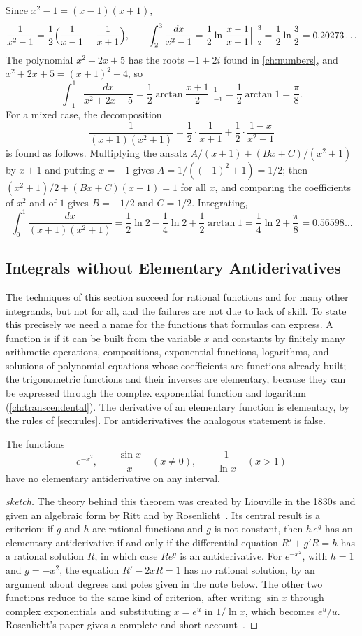 Since $x^2-1=(x-1)(x+1)$,
\[
\frac1{x^2-1}=\frac12\Bigl(\frac1{x-1}-\frac1{x+1}\Bigr),\qquad\int_2^3\frac{dx}{x^2-1}=\frac12\ln\Bigl|\frac{x-1}{x+1}\Bigr|\,\Big|_2^3=\frac12\ln\frac32=0.20273\ldots
\]
The polynomial $x^2+2x+5$ has the roots $-1\pm2i$ found in \cref{ch:numbers}, and $x^2+2x+5=(x+1)^2+4$, so
\[
\int_{-1}^1\frac{dx}{x^2+2x+5}=\frac12\arctan\frac{x+1}2\,\Big|_{-1}^1=\frac12\arctan1=\frac\pi8 .
\]
For a mixed case, the decomposition
\[
\frac1{(x+1)(x^2+1)}=\frac12\cdot\frac1{x+1}+\frac12\cdot\frac{1-x}{x^2+1}
\]
is found as follows. Multiplying the ansatz $A/(x+1)+(Bx+C)/(x^2+1)$ by $x+1$ and putting $x=-1$ gives $A=1/((-1)^2+1)=1/2$; then $(x^2+1)/2+(Bx+C)(x+1)=1$ for all $x$, and comparing the coefficients of $x^2$ and of $1$ gives $B=-1/2$ and $C=1/2$. Integrating,
\[
\int_0^1\frac{dx}{(x+1)(x^2+1)}=\frac12\ln2-\frac14\ln2+\frac12\arctan1=\frac14\ln2+\frac\pi8=0.56598\ldots
\]

\subsection{Integrals without Elementary Antiderivatives}

The techniques of this section succeed for rational functions and for many other integrands, but not for all, and the failures are not due to lack of skill. To state this precisely we need a name for the functions that formulas can express. A function is  if it can be built from the variable $x$ and constants by finitely many arithmetic operations, compositions, exponential functions, logarithms, and solutions of polynomial equations whose coefficients are functions already built; the trigonometric functions and their inverses are elementary, because they can be expressed through the complex exponential function and logarithm (\cref{ch:transcendental}). The derivative of an elementary function is elementary, by the rules of \cref{sec:rules}. For antiderivatives the analogous statement is false.

\begin{theorem}[Liouville]
\label{thm:liouville}
The functions
\[
e^{-x^2},\qquad\frac{\sin x}x\quad(x\ne0),\qquad\frac1{\ln x}\quad(x>1)
\]
have no elementary antiderivative on any interval.
\end{theorem}

\begin{proof}[sketch]
The theory behind this theorem was created by Liouville in the 1830s and given an algebraic form by Ritt and by Rosenlicht~\cite{ritt1948,rosenlicht1972}. Its central result is a criterion: if $g$ and $h$ are rational functions and $g$ is not constant, then $h\,e^g$ has an elementary antiderivative if and only if the differential equation $R'+g'R=h$ has a rational solution $R$, in which case $Re^g$ is an antiderivative. For $e^{-x^2}$, with $h=1$ and $g=-x^2$, the equation $R'-2xR=1$ has no rational solution, by an argument about degrees and poles given in the note below. The other two functions reduce to the same kind of criterion, after writing $\sin x$ through complex exponentials and substituting $x=e^u$ in $1/\ln x$, which becomes $e^u/u$. Rosenlicht's paper gives a complete and short account~\cite{rosenlicht1972}.
\end{proof}

